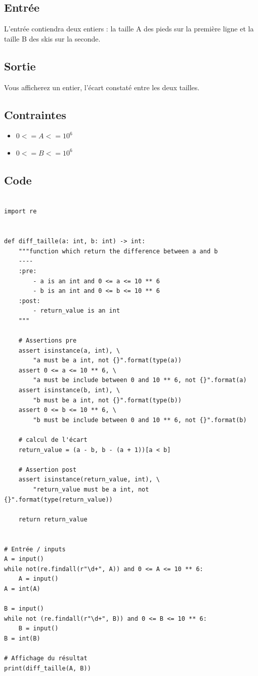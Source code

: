 \documentclass{article}
\begin{document}
        \subsection{Entrée}
            L’entrée contiendra deux entiers : la taille A des pieds sur la première ligne et la taille B
            des skis sur la seconde.
        \subsection{Sortie}
            Vous afficherez un entier, l’écart constaté entre les deux tailles.
        \subsection{Contraintes}
            \begin{itemize}
                \item $0 <= A <= 10^6$
                \item $0 <= B <= 10^6$
            \end{itemize}
        \subsection{Code}
            \begin{verbatim}

import re


def diff_taille(a: int, b: int) -> int:
    """function which return the difference between a and b
    ----
    :pre:
        - a is an int and 0 <= a <= 10 ** 6
        - b is an int and 0 <= b <= 10 ** 6
    :post:
        - return_value is an int
    """

    # Assertions pre
    assert isinstance(a, int), \
        "a must be a int, not {}".format(type(a))
    assert 0 <= a <= 10 ** 6, \
        "a must be include between 0 and 10 ** 6, not {}".format(a)
    assert isinstance(b, int), \
        "b must be a int, not {}".format(type(b))
    assert 0 <= b <= 10 ** 6, \
        "b must be include between 0 and 10 ** 6, not {}".format(b)

    # calcul de l'écart
    return_value = (a - b, b - (a + 1))[a < b]

    # Assertion post
    assert isinstance(return_value, int), \
        "return_value must be a int, not {}".format(type(return_value))

    return return_value


# Entrée / inputs
A = input()
while not(re.findall(r"\d+", A)) and 0 <= A <= 10 ** 6:
    A = input()
A = int(A)

B = input()
while not (re.findall(r"\d+", B)) and 0 <= B <= 10 ** 6:
    B = input()
B = int(B)

# Affichage du résultat
print(diff_taille(A, B))
            \end{verbatim}
        \newpage
\end{document}
